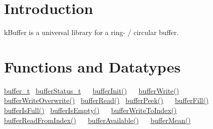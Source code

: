 \hypertarget{index_intro}{}\section{Introduction}\label{index_intro}
k\+Buffer is a universal library for a ring-\/ / circular buffer. \hypertarget{index_function}{}\section{Functions and Datatypes}\label{index_function}
\hyperlink{structbuffer__t}{buffer\+\_\+t}~\newline
 \hyperlink{k_buffer_8h_a7a0bf550b7bd49d85172e409c0034fe6}{buffer\+Status\+\_\+t}~\newline
 ~\newline
 \hyperlink{k_buffer_8c_aec18d6ea571b1326dbeb7ca15f4969c0}{buffer\+Init()}~\newline
 ~\newline
 \hyperlink{k_buffer_8c_a9d6410a89adf65a3ef12340ecb9bbd55}{buffer\+Write()}~\newline
 \hyperlink{k_buffer_8c_af040a9062bc907adde9517c27c870be5}{buffer\+Write\+Overwrite()}~\newline
 \hyperlink{k_buffer_8c_a9b80be9033ccd6b5a101f811520ab4cc}{buffer\+Read()}~\newline
 \hyperlink{k_buffer_8c_a5ecef1fd460ed9635269abce02be866f}{buffer\+Peek()}~\newline
 ~\newline
 \hyperlink{k_buffer_8c_ac806d926fd21729feb18f8e7738e76b4}{buffer\+Fill()} ~\newline
 \hyperlink{k_buffer_8c_ac69b8a12a33d0cf0a5dab8feb4f7b020}{buffer\+Is\+Full()}~\newline
 \hyperlink{k_buffer_8c_a5c599b9386c73ccd7b5eeb25f6cca38e}{buffer\+Is\+Empty()}~\newline
 ~\newline
 \hyperlink{k_buffer_8c_a8508583be1e356a243b0ce67254c516e}{buffer\+Write\+To\+Index()}~\newline
 \hyperlink{k_buffer_8c_aa0d7e2a4b6fd3da2822d7f968be74e5c}{buffer\+Read\+From\+Index()}~\newline
 ~\newline
 \hyperlink{k_buffer_8c_afa8bb2b701cd9b7f871c12e0fabd66e1}{buffer\+Available()}~\newline
 ~\newline
 \hyperlink{k_buffer_8c_a1389f5c08210e077301c35bc3b43f681}{buffer\+Mean()}~\newline
